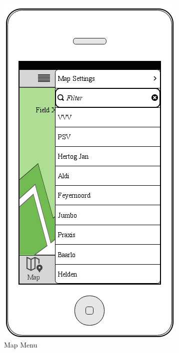 \documentclass[12pt]{article}
\begin{document}
\begin{figure}[ht]
	\centering
	\includegraphics[width=\linewidth, height=0.4\textheight, keepaspectratio=true]{mockups/MapMenu.png}
	\caption{Map Menu}
	\endminipage\hfill
	\centering

\end{figure}
\end{document}
